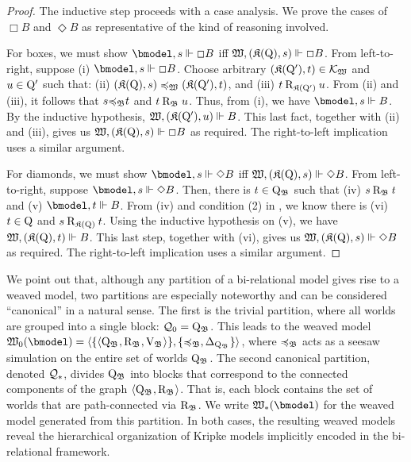 \begin{proof}
    \medskip
    \noindent
    The inductive step proceeds with a case analysis.
    We prove the cases of $\Box B$ and $\Diamond B$ as representative of the kind of reasoning involved.

    \medskip
    \noindent
    For boxes, we must show $\bforces s {\Box B}$ iff $\xforces {\wmodel} {\pair {\kmodel(\Q)} s} {\Box B}$.
    From left-to-right, suppose (i) $\bforces s \Box B$.
    Choose arbitrary ${\pair {\kmodel(\Q')} t} \in \Kof{\wmodel}$ and $u \in \Q'$ such that:
        (ii) ${\pair {\kmodel(\Q)} s} \Fof{\wmodel} {\pair {\kmodel(\Q')} t}$, and
        (iii) $t \Rof{\kmodel(\Q')} u$.
    From (ii) and (iii), it follows that $s \Fbm t$ and $t \Rbm u$.
    Thus, from (i), we have $\bforces s B$.
    By the inductive hypothesis, $\xforces {\wmodel} {\pair {\kmodel(\Q')} u} B$.
    This last fact, together with (ii) and (iii), gives us $\xforces {\wmodel} {\pair{\kmodel(\Q)}{s}} {\Box B}$ as required.
    The right-to-left implication uses a similar argument.

    \medskip
    \noindent
    For diamonds, we must show $\bforces s {\Diamond B}$ iff $\xforces {\wmodel} {\pair {\kmodel(\Q)} {s}} {\Diamond B}$.
    From left-to-right, suppose $\bforces s {\Diamond B}$.
    Then, there is $t \in \Wbm$ such that (iv) $s \Rbm t$ and (v) $\bforces t B$.
    From (iv) and condition (2) in , we know there is (vi) $t \in \Q$ and $s \Rof{\kmodel(\Q)} t$.
    Using the inductive hypothesis on (v), we have $\xforces {\wmodel} {\pair {\kmodel(\Q)} t} B$.
    This last step, together with (vi), gives us $\xforces {\wmodel} {\pair {\kmodel(\Q)} s} {\Diamond B}$ as required.
    The right-to-left implication uses a similar argument.
\end{proof}

We point out that, although any partition of a bi-relational model gives rise to a weaved model, two partitions are especially noteworthy and can be considered ``canonical'' in a natural sense.
The first is the trivial partition, where all worlds are grouped into a single block: $\QQs[0] = {\Qbm}$. This leads to the weaved model $\wmofbm0 = \tuple{\set{\tuple{\Qbm, \Rbm, \Vbm}}, \set{\Fbm, \Delta_{\Qbm}}}$, where $\Fbm$ acts as a seesaw simulation on the entire set of worlds $\Qbm$.
The second canonical partition, denoted $\QQs[\ast]$, divides $\Qbm$ into blocks that correspond to the connected components of the graph $\tuple{\Qbm, \Rbm}$. That is, each block contains the set of worlds that are path-connected via $\Rbm$. We write $\wmofbm\ast$ for the weaved model generated from this partition.
In both cases, the resulting weaved models reveal the hierarchical organization of Kripke models implicitly encoded in the bi-relational framework.

